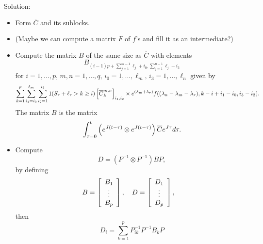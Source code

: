 \documentclass{article}
\begin{document}
Solution:
\begin{itemize}
    \item Form \(\overline C\) and its sublocks. 
    \item (Maybe we can compute a matrix \(F\) of \(f\)'s and fill it as an intermediate?)
    \item Compute the matrix \(B\) of the same size as \(\overline C\) with elements 
    \[
        B_{(i-1)p+\sum_{j=1}^{m-1}\ell_j+i_0, \sum_{j=1}^{n-1}\ell_j+i_3}
    \] 
    for \(i=1,...,p\), \(m,n=1,...,q\), \(i_0=1,...,\ell_m,\,i_3=1,...,\ell_n\) given by
    \[
        \sum_{k=1}^p\sum_{i_1=i_0}^{\ell_m}\sum_{i_2=1}^{i_3}1(S_r+\ell_{r}> k\geq i)\left[\overline{C}_k^{m,n}\right]_{i_1,i_2}
        \times\Exp{(\lambda_m+\lambda_r)}f((\lambda_n-\lambda_m-\lambda_r), k-i+i_1-i_0, i_3-i_2).
    \]
    The matrix \(B\) is the matrix
    \[
        \int_{\tau=0}^t \left(\Exp{J (t-\tau)}\otimes \Exp{J(t-\tau)}\right) \overline C \Exp{J \tau} d \tau.
    \]
    \item Compute 
    \[
        D=\left(P^{-1}\otimes P^{-1}\right)BP,
    \] by defining 
    \[
        B=\Matrix{c}{B_1\\\vdots\\B_p},\quad D=\Matrix{c}{D_1\\\vdots\\D_p},\quad 
    \]
    then 
    \[
        D_i = \sum_{k=1}^p P^{-1}_{ik}P^{-1}B_kP
    \]
\end{itemize}
\end{document}
